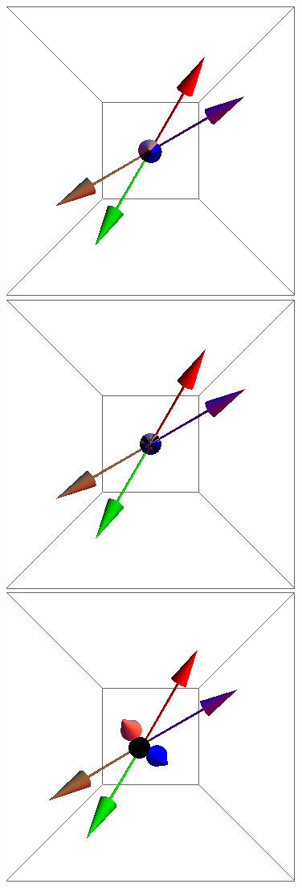 \documentclass{article}
\begin{document}
\begin{figure}[ht]
\centering
\includegraphics[scale=0.27]{100/1S005to000G.png}
\includegraphics[scale=0.27]{100/3S005to000G.png}
\includegraphics[scale=0.27]{100/55S005to000G.png}

\end{figure}
\end{document}
